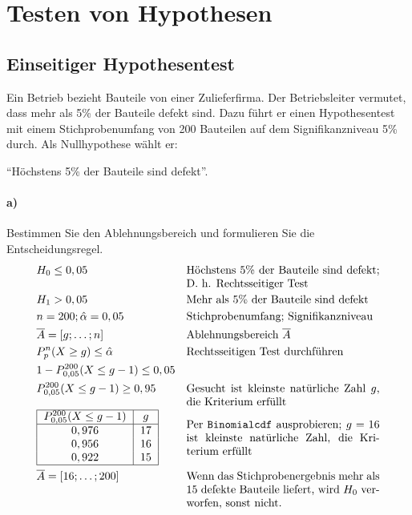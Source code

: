 \documentclass[10pt]{article}
\begin{document}
\section{Testen von Hypothesen}

\subsection{Einseitiger Hypothesentest}
\begin{example}
Ein Betrieb bezieht Bauteile von einer Zulieferfirma. Der Betriebsleiter vermutet,
dass mehr als 5\% der Bauteile defekt sind. Dazu führt er einen Hypothesentest
mit einem Stichprobenumfang von 200 Bauteilen auf dem Signifikanzniveau 5\% durch. Als Nullhypothese wählt er:

\enquote{Höchstens 5\% der Bauteile sind defekt}.
\paragraph{a)} Bestimmen Sie den Ablehnungsbereich und formulieren Sie die Entscheidungsregel.
\addtolength{\jot}{1em}
\begin{align*}
&H_0 \leq 0,05 &\parbox[t]{0.5\linewidth}{Höchstens 5\% der Bauteile sind defekt; D. h. Rechtsseitiger Test} \\
&H_1 > 0,05 &\parbox[t]{0.5\linewidth}{Mehr als 5\% der Bauteile sind defekt} \\
&n = 200; \hat\alpha = 0,05 &\parbox[t]{0.5\linewidth}{Stichprobenumfang; Signifikanzniveau} \\
&\overline A = [g;\dots;n] &\parbox[t]{0.5\linewidth}{Ablehnungsbereich $\overline A$} \\
&P^n_p(X \geq g) \leq \hat\alpha &\parbox[t]{0.5\linewidth}{Rechtsseitigen Test durchführen} \\
&1 - P^{200}_{0,05}(X \leq g - 1) \leq 0,05 &\parbox[t]{0.5\linewidth}{} \\
&P^{200}_{0,05}(X \leq g - 1) \geq 0,95 &\parbox[t]{0.5\linewidth}{Gesucht ist kleinste natürliche Zahl $g$, die Kriterium erfüllt} \\
& \begin{tabular}{|c|c|}
	\hline
	$P^{200}_{0,05}(X \leq g - 1)$ & $g$ \\ \hline
	$0,976$ & $17$ \\
	$0,956$ & $16$ \\
	$0,922$ & $15$ \\
	\hline
	\end{tabular} &\parbox{0.5\linewidth}{Per \texttt{Binomialcdf} ausprobieren; $g = 16$ ist kleinste natürliche Zahl, die Kriterium erfüllt}\\
&\overline A = [16;\dots;200] &\parbox[t]{0.5\linewidth}{Wenn das Stichprobenergebnis mehr als $15$ defekte Bauteile liefert, wird $H_0$ verworfen, sonst nicht.}
\end{align*}

\end{example}
\end{document}
